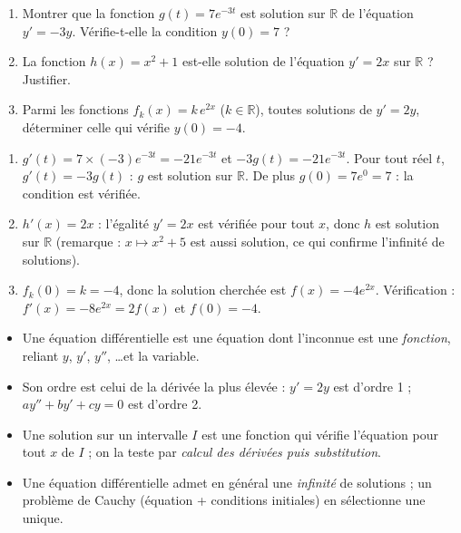 \documentclass[11pt]{article}
\newcommand{\cle}[1]{{\popxbold\color{popdark}#1}}
\begin{document}
\begin{exercice}
\begin{enumerate}
\item Montrer que la fonction $g(t) = 7e^{-3t}$ est solution sur $\mathbb{R}$ de l'équation $y' = -3y$. Vérifie-t-elle la condition $y(0) = 7$ ?
\item La fonction $h(x) = x^2 + 1$ est-elle solution de l'équation $y' = 2x$ sur $\mathbb{R}$ ? Justifier.
\item Parmi les fonctions $f_k(x) = k\,e^{2x}$ ($k \in \mathbb{R}$), toutes solutions de $y' = 2y$, déterminer celle qui vérifie $y(0) = -4$.
\end{enumerate}
\end{exercice}

\begin{corrige}
\begin{enumerate}
\item $g'(t) = 7 \times (-3)e^{-3t} = -21e^{-3t}$ et $-3g(t) = -21e^{-3t}$. Pour tout réel $t$, $g'(t) = -3g(t)$ : $g$ est solution sur $\mathbb{R}$. De plus $g(0) = 7e^{0} = 7$ : la condition est vérifiée.
\item $h'(x) = 2x$ : l'égalité $y' = 2x$ est vérifiée pour tout $x$, donc $h$ est solution sur $\mathbb{R}$ (remarque : $x \mapsto x^2 + 5$ est aussi solution, ce qui confirme l'infinité de solutions).
\item $f_k(0) = k = -4$, donc la solution cherchée est $f(x) = -4e^{2x}$. Vérification : $f'(x) = -8e^{2x} = 2f(x)$ et $f(0) = -4$.
\end{enumerate}
\end{corrige}

\begin{aretenir}
\begin{itemize}
\item Une \cle{équation différentielle} est une équation dont l'inconnue est une \emph{fonction}, reliant $y$, $y'$, $y''$, \dots et la variable.
\item Son \cle{ordre} est celui de la dérivée la plus élevée : $y' = 2y$ est d'ordre 1 ; $ay'' + by' + cy = 0$ est d'ordre 2.
\item Une \cle{solution} sur un intervalle $I$ est une fonction qui vérifie l'équation pour tout $x$ de $I$ ; on la teste par \emph{calcul des dérivées puis substitution}.
\item Une équation différentielle admet en général une \emph{infinité} de solutions ; un \cle{problème de Cauchy} (équation + conditions initiales) en sélectionne une unique.
\end{itemize}
\end{aretenir}
\end{document}
